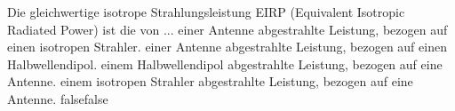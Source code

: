     {Die gleichwertige isotrope Strahlungsleistung EIRP (Equivalent Isotropic Radiated Power) ist die von ...}
    {einer Antenne abgestrahlte Leistung, bezogen auf einen isotropen Strahler.}
    {einer Antenne abgestrahlte Leistung, bezogen auf einen Halbwellendipol.}
    {einem Halbwellendipol abgestrahlte Leistung, bezogen auf eine Antenne.}
    {einem isotropen Strahler abgestrahlte Leistung, bezogen auf eine Antenne.}
    {false}{false}